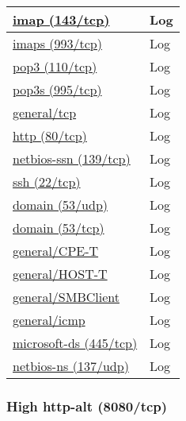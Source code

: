 \documentclass{article}
\begin{document}
\begin{longtable}{|l|l|}
\hline
\hyperref[port:192.168.1.10 imap (143/tcp) Log]{imap (143/tcp)}&Log\\
\hline
\hyperref[port:192.168.1.10 imaps (993/tcp) Log]{imaps (993/tcp)}&Log\\
\hline
\hyperref[port:192.168.1.10 pop3 (110/tcp) Log]{pop3 (110/tcp)}&Log\\
\hline
\hyperref[port:192.168.1.10 pop3s (995/tcp) Log]{pop3s (995/tcp)}&Log\\
\hline
\hyperref[port:192.168.1.10 general/tcp Log]{general/tcp}&Log\\
\hline
\hyperref[port:192.168.1.10 http (80/tcp) Log]{http (80/tcp)}&Log\\
\hline
\hyperref[port:192.168.1.10 netbios-ssn (139/tcp) Log]{netbios-ssn (139/tcp)}&Log\\
\hline
\hyperref[port:192.168.1.10 ssh (22/tcp) Log]{ssh (22/tcp)}&Log\\
\hline
\hyperref[port:192.168.1.10 domain (53/udp) Log]{domain (53/udp)}&Log\\
\hline
\hyperref[port:192.168.1.10 domain (53/tcp) Log]{domain (53/tcp)}&Log\\
\hline
\hyperref[port:192.168.1.10 general/CPE-T Log]{general/CPE-T}&Log\\
\hline
\hyperref[port:192.168.1.10 general/HOST-T Log]{general/HOST-T}&Log\\
\hline
\hyperref[port:192.168.1.10 general/SMBClient Log]{general/SMBClient}&Log\\
\hline
\hyperref[port:192.168.1.10 general/icmp Log]{general/icmp}&Log\\
\hline
\hyperref[port:192.168.1.10 microsoft-ds (445/tcp) Log]{microsoft-ds (445/tcp)}&Log\\
\hline
\hyperref[port:192.168.1.10 netbios-ns (137/udp) Log]{netbios-ns (137/udp)}&Log\\
\hline
\end{longtable}



\subsubsection{High http-alt (8080/tcp)}
\label{port:192.168.1.10 http-alt (8080/tcp) High}
\end{document}
